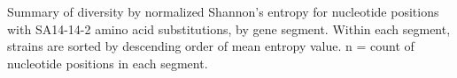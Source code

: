 \documentclass{report}
\begin{document}
\begin{table}[h]
	\centering
	\begin{ThreePartTable}

	\caption[Summary of diversity by normalized Shannon's entropy for nucleotide positions with SA14-14-2 amino acid
	substitutions, by gene segment.]{Summary of diversity by normalized Shannon's entropy for nucleotide positions with SA14-14-2 amino acid
		substitutions, by gene segment. Within each segment, strains are sorted by descending order of mean entropy value. n = count
		of nucleotide positions in each segment.}

	\label{my-label}
	
	\begin{tablenotes}
	\item[]
	\end{tablenotes}
	\end{ThreePartTable}
\end{table}
\end{document}

